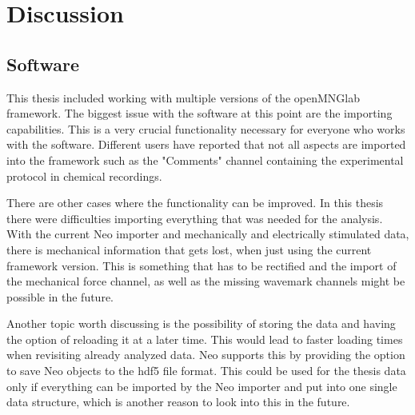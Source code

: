 \chapter{Discussion}
\begin{comment}
-speak about the problems with the software
- what needs to be fixed


-analysis:
-threshold, already mentioned in Robertos paper
-active nerve fiber has decreased response
-not linear

hdf5 not yet feasible, since we get 3 separate data structures and not one single concise format.


In this chapter I will discuss the results presented in the previous chapter and think about possible future work regarding the analysis. Also I will discuss the integration of my code (quantifiers mainly) into openMNGlab and thoughts about the structuring of the software.
\end{comment}
\section{Software}
This thesis included working with multiple versions of the openMNGlab framework. The biggest issue with the software at this point are the importing capabilities. This is a very crucial functionality necessary for everyone who works with the software. Different users have reported that not all aspects are imported into the framework such as the "Comments" channel containing the experimental protocol in chemical recordings. 

There are other cases where the functionality can be improved. In this thesis there were difficulties importing everything that was needed for the analysis. With the current Neo importer and mechanically and electrically stimulated data, there is mechanical information that gets lost, when just using the current framework version. This is something that has to be rectified and the import of the mechanical force channel, as well as the missing wavemark channels might be possible in the future. 

Another topic worth discussing is the possibility of storing the data and having the option of reloading it at a later time. This would lead to faster loading times when revisiting already analyzed data. Neo supports this by providing the option to save Neo objects to the hdf5 file format. This could be used for the thesis data only if everything can be imported by the Neo importer and put into one single data structure, which is another reason to look into this in the future. 

